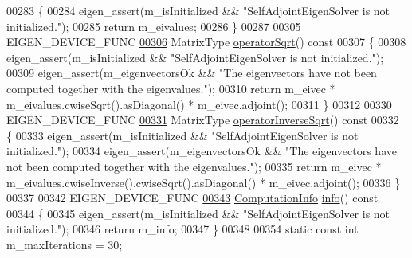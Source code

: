 \begin{DoxyCode}
00283 \textcolor{keyword}{    }\{
00284       eigen\_assert(m\_isInitialized && \textcolor{stringliteral}{"SelfAdjointEigenSolver is not initialized."});
00285       \textcolor{keywordflow}{return} m\_eivalues;
00286     \}
00287 
00305     EIGEN\_DEVICE\_FUNC
\hyperlink{group___eigenvalues___module_a5c5158fd86366081bdabec38112c2c8a}{00306}     MatrixType \hyperlink{group___eigenvalues___module_a5c5158fd86366081bdabec38112c2c8a}{operatorSqrt}()\textcolor{keyword}{ const}
00307 \textcolor{keyword}{    }\{
00308       eigen\_assert(m\_isInitialized && \textcolor{stringliteral}{"SelfAdjointEigenSolver is not initialized."});
00309       eigen\_assert(m\_eigenvectorsOk && \textcolor{stringliteral}{"The eigenvectors have not been computed together with the
       eigenvalues."});
00310       \textcolor{keywordflow}{return} m\_eivec * m\_eivalues.cwiseSqrt().asDiagonal() * m\_eivec.adjoint();
00311     \}
00312 
00330     EIGEN\_DEVICE\_FUNC
\hyperlink{group___eigenvalues___module_a71fe0aea0b22d176efcea556c5c160f5}{00331}     MatrixType \hyperlink{group___eigenvalues___module_a71fe0aea0b22d176efcea556c5c160f5}{operatorInverseSqrt}()\textcolor{keyword}{ const}
00332 \textcolor{keyword}{    }\{
00333       eigen\_assert(m\_isInitialized && \textcolor{stringliteral}{"SelfAdjointEigenSolver is not initialized."});
00334       eigen\_assert(m\_eigenvectorsOk && \textcolor{stringliteral}{"The eigenvectors have not been computed together with the
       eigenvalues."});
00335       \textcolor{keywordflow}{return} m\_eivec * m\_eivalues.cwiseInverse().cwiseSqrt().asDiagonal() * m\_eivec.adjoint();
00336     \}
00337 
00342     EIGEN\_DEVICE\_FUNC
\hyperlink{group___eigenvalues___module_a56bd59b85a6f6f00ff7bff307ad0e015}{00343}     \hyperlink{group__enums_ga85fad7b87587764e5cf6b513a9e0ee5e}{ComputationInfo} \hyperlink{group___eigenvalues___module_a56bd59b85a6f6f00ff7bff307ad0e015}{info}()\textcolor{keyword}{ const}
00344 \textcolor{keyword}{    }\{
00345       eigen\_assert(m\_isInitialized && \textcolor{stringliteral}{"SelfAdjointEigenSolver is not initialized."});
00346       \textcolor{keywordflow}{return} m\_info;
00347     \}
00348 
00354     \textcolor{keyword}{static} \textcolor{keyword}{const} \textcolor{keywordtype}{int} m\_maxIterations = 30;

\end{DoxyCode}
